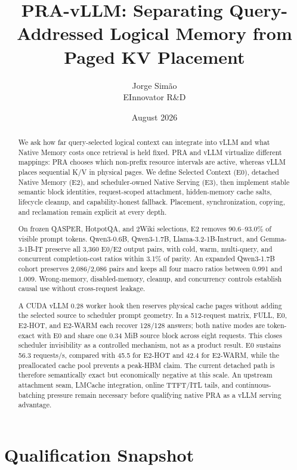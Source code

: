 \documentclass[10pt]{article}
\title{PRA-vLLM: Separating Query-Addressed Logical Memory from Paged KV Placement}
\author{Jorge Sim\~ao\\EInnovator R\&D}
\date{August 2026}
\begin{document}
\maketitle

\begin{abstract}
We ask how far query-selected logical context can integrate into vLLM and what
Native Memory costs once retrieval is held fixed. PRA and vLLM virtualize
different mappings: PRA chooses which non-prefix resource intervals are active,
whereas vLLM places sequential K/V in physical pages. We define Selected
Context (E0), detached Native Memory (E2), and scheduler-owned Native Serving
(E3), then implement stable semantic block identities, request-scoped
attachment, hidden-memory cache salts, lifecycle cleanup, and capability-honest
fallback. Placement, synchronization, copying, and reclamation remain explicit
at every depth.

On frozen QASPER, HotpotQA, and 2Wiki selections, E2 removes 90.6--93.0\% of
visible prompt tokens. Qwen3-0.6B, Qwen3-1.7B, Llama-3.2-1B-Instruct, and
Gemma-3-1B-IT preserve all 3,360 E0/E2 output pairs, with cold, warm,
multi-query, and concurrent completion-cost ratios within 3.1\% of parity. An
expanded Qwen3-1.7B cohort preserves 2,086/2,086 pairs and keeps all four macro
ratios between 0.991 and 1.009. Wrong-memory, disabled-memory, cleanup, and
concurrency controls establish causal use without cross-request leakage.

A CUDA vLLM 0.28 worker hook then reserves physical cache pages without adding
the selected source to scheduler prompt geometry. In a 512-request matrix,
FULL, E0, E2-HOT, and E2-WARM each recover 128/128 answers; both native modes
are token-exact with E0 and share one 0.34 MiB source block across eight
requests. This closes scheduler invisibility as a controlled mechanism, not as
a product result. E0 sustains 56.3 requests/s, compared with 45.5 for E2-HOT
and 42.4 for E2-WARM, while the preallocated cache pool prevents a peak-HBM
claim. The current detached path is therefore semantically exact but
economically negative at this scale. An upstream attachment seam, LMCache
integration, online TTFT/ITL tails, and continuous-batching pressure remain
necessary before qualifying native PRA as a vLLM serving advantage.
\end{abstract}

\section{Qualification Snapshot}
\end{document}
